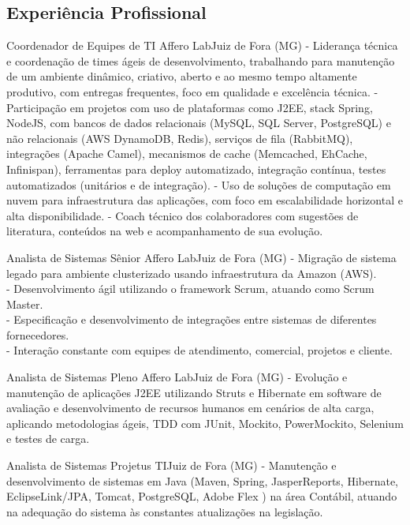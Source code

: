 \documentclass[12pt, a4paper, sans]{moderncv}
\begin{document}
\makecvtitle


%
%
\subsection{Experiência Profissional}
{Coordenador de Equipes de TI}
{Affero Lab}{Juiz de Fora (MG)}{}
{
- Liderança técnica e coordenação de times ágeis de desenvolvimento, trabalhando para manutenção de um ambiente dinâmico, criativo, aberto e ao mesmo tempo altamente produtivo, com entregas frequentes, foco em qualidade e excelência técnica.\newline{}
- Participação em projetos com uso de plataformas como J2EE, stack Spring, NodeJS, com bancos de dados relacionais (MySQL, SQL Server, PostgreSQL) e não relacionais (AWS DynamoDB, Redis), serviços de fila (RabbitMQ), integrações (Apache Camel), mecanismos de cache (Memcached, EhCache, Infinispan), ferramentas para deploy automatizado, integração contínua, testes automatizados (unitários e de integração).\newline{}
- Uso de soluções de computação em nuvem para infraestrutura das aplicações, com foco em escalabilidade horizontal e alta disponibilidade.\newline{}
- Coach técnico dos colaboradores com sugestões de literatura, conteúdos na web e acompanhamento de sua evolução.}

{Analista de Sistemas Sênior}
{Affero Lab}{Juiz de Fora (MG)}{}
{- Migração de sistema legado para ambiente clusterizado usando infraestrutura da Amazon (AWS).\\
- Desenvolvimento ágil utilizando o framework Scrum, atuando como Scrum Master.\\
- Especificação e desenvolvimento de integrações entre sistemas de diferentes fornecedores.\\
- Interação constante com equipes de atendimento, comercial, projetos e cliente.}

{Analista de Sistemas Pleno}
{Affero Lab}{Juiz de Fora (MG)}{}
{- Evolução e manutenção de aplicações J2EE utilizando Struts e Hibernate em software de avaliação e desenvolvimento de recursos humanos em cenários de alta carga, aplicando metodologias ágeis, TDD com JUnit, Mockito, PowerMockito, Selenium e testes de carga.}

{Analista de Sistemas}
{Projetus TI}{Juiz de Fora (MG)}{}
{- Manutenção e desenvolvimento de sistemas em Java (Maven, Spring, JasperReports, Hibernate, EclipseLink/JPA, Tomcat, PostgreSQL, Adobe Flex ) na área Contábil, atuando na adequação do sistema às constantes atualizações na legislação.}
\end{document}
